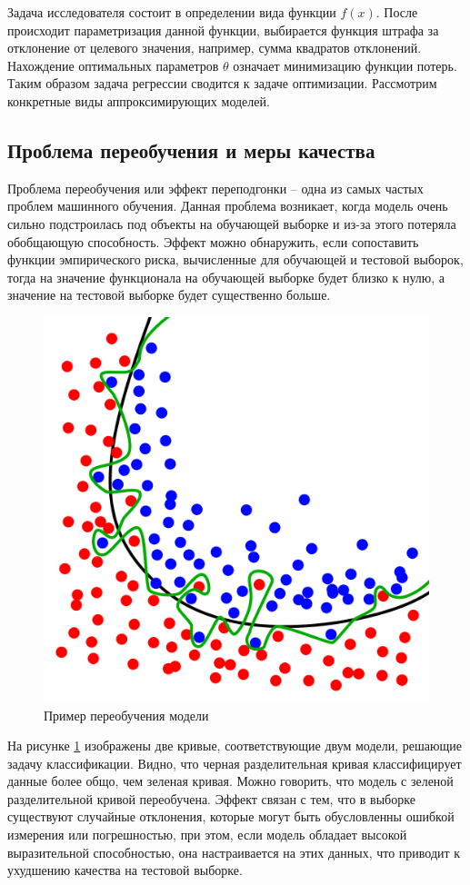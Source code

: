 Задача исследователя состоит в определении вида функции $f(x)$. После происходит параметризация данной функции, выбирается функция штрафа за отклонение от целевого значения, например, сумма квадратов отклонений. Нахождение оптимальных параметров $\theta$ означает минимизацию функции потерь. Таким образом задача регрессии сводится к задаче оптимизации. Рассмотрим конкретные виды аппроксимирующих моделей.


\subsection{Проблема переобучения и меры качества}

Проблема переобучения или эффект переподгонки -- одна из самых частых проблем машинного обучения. Данная проблема возникает, когда модель очень сильно подстроилась под объекты на обучающей выборке и из-за этого потеряла обобщающую способность. Эффект можно обнаружить, если сопоставить функции эмпирического риска, вычисленные для обучающей и тестовой выборок, тогда на значение функционала на обучающей выборке будет близко к нулю, а значение на тестовой выборке будет существенно больше.

\begin{figure}[H]
    \begin{center}
        \includegraphics[width=0.4\linewidth]{src/img/wiki_overfitting.png}
        \caption{Пример переобучения модели \cite{wiki:overfitting}}
        \label{fig:wiki_overfitting}
    \end{center}
\end{figure}


На рисунке \ref{fig:wiki_overfitting} изображены две кривые, соответствующие двум модели, решающие задачу классификации. Видно, что черная разделительная кривая классифицирует данные более общо, чем зеленая кривая. Можно говорить, что модель с зеленой разделительной кривой переобучена. Эффект связан с тем, что в выборке существуют случайные отклонения, которые могут быть обусловленны ошибкой измерения или погрешностью, при этом, если модель обладает высокой выразительной способностью, она настраивается на этих данных, что приводит к ухудшению качества на тестовой выборке.

